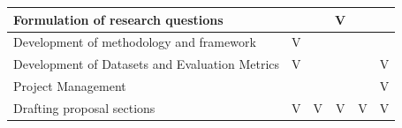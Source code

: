 \begin{table}[H]
{\begin{tabular}{|l|c|l|l|l|c|}
Formulation of research questions                                      & \multicolumn{1}{l|}{}                                                         &                                                                                       & \multicolumn{1}{c|}{V}                                                              &                                                                                       & \multicolumn{1}{l|}{}                                           \\ \hline
Development of methodology and framework                               & V                                                                             &                                                                                       &                                                                                     &                                                                                       & \multicolumn{1}{l|}{}                                           \\ \hline
Development of Datasets and Evaluation Metrics                         & V                                                                             &                                                                                       &                                                                                     &                                                                                       & V                                                               \\ \hline
Project Management                                                     &                                                                               &                                                                                       &                                                                                     &                                                                                       & V                                                               \\ \hline
Drafting proposal sections                                             & V                                                                             & \multicolumn{1}{c|}{V}                                                                & \multicolumn{1}{c|}{V}                                                              & \multicolumn{1}{c|}{V}                                                                & V                                                               \\ \hline

\end{tabular}}
\end{table}
